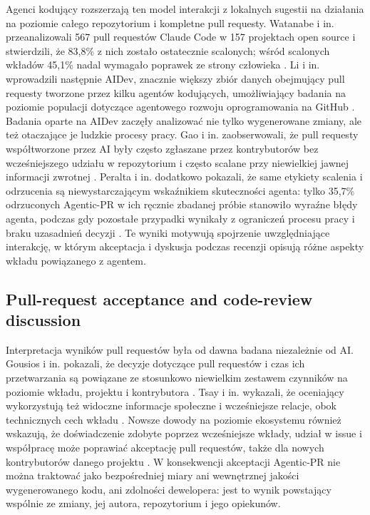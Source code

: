 Agenci kodujący rozszerzają ten model interakcji z lokalnych sugestii na działania na poziomie całego repozytorium i kompletne pull requesty. Watanabe i in. przeanalizowali 567 pull requestów Claude Code w 157 projektach open source i stwierdzili, że 83,8\% z nich zostało ostatecznie scalonych; wśród scalonych wkładów 45,1\% nadal wymagało poprawek ze strony człowieka \cite{watanabe2025agentic}. Li i in. wprowadzili następnie AIDev, znacznie większy zbiór danych obejmujący pull requesty tworzone przez kilku agentów kodujących, umożliwiający badania na poziomie populacji dotyczące agentowego rozwoju oprogramowania na GitHub \cite{li2026aidev}. Badania oparte na AIDev zaczęły analizować nie tylko wygenerowane zmiany, ale też otaczające je ludzkie procesy pracy. Gao i in. zaobserwowali, że pull requesty współtworzone przez AI były często zgłaszane przez kontrybutorów bez wcześniejszego udziału w repozytorium i często scalane przy niewielkiej jawnej informacji zwrotnej \cite{gao2026autopilot}. Peralta i in. dodatkowo pokazali, że same etykiety scalenia i odrzucenia są niewystarczającym wskaźnikiem skuteczności agenta: tylko 35,7\% odrzuconych Agentic-PR w ich ręcznie zbadanej próbie stanowiło wyraźne błędy agenta, podczas gdy pozostałe przypadki wynikały z ograniczeń procesu pracy i braku uzasadnień decyzji \cite{peralta2026decisions}. Te wyniki motywują spojrzenie uwzględniające interakcję, w którym akceptacja i dyskusja podczas recenzji opisują różne aspekty wkładu powiązanego z agentem.

\subsection{Pull-request acceptance and code-review discussion}
Interpretacja wyników pull requestów była od dawna badana niezależnie od AI. Gousios i in. pokazali, że decyzje dotyczące pull requestów i czas ich przetwarzania są powiązane ze stosunkowo niewielkim zestawem czynników na poziomie wkładu, projektu i kontrybutora \cite{gousios2014pull}. Tsay i in. wykazali, że oceniający wykorzystują też widoczne informacje społeczne i wcześniejsze relacje, obok technicznych cech wkładu \cite{tsay2014influence}. Nowsze dowody na poziomie ekosystemu również wskazują, że doświadczenie zdobyte poprzez wcześniejsze wkłady, udział w issue i współpracę może poprawiać akceptację pull requestów, także dla nowych kontrybutorów danego projektu \cite{meijer2025ecosystem}. W konsekwencji akceptacji Agentic-PR nie można traktować jako bezpośredniej miary ani wewnętrznej jakości wygenerowanego kodu, ani zdolności dewelopera: jest to wynik powstający wspólnie ze zmiany, jej autora, repozytorium i jego opiekunów.


